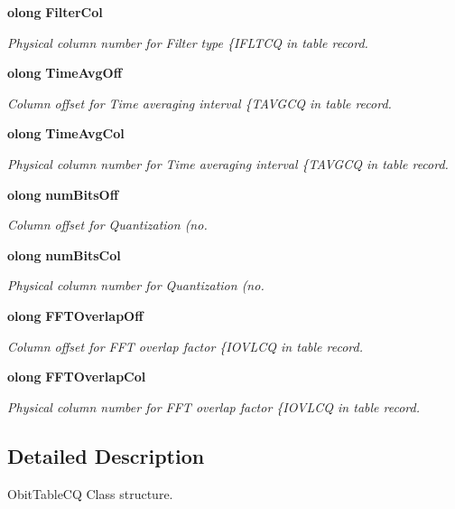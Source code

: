 \begin{CompactItemize}
{\bf olong} {\bf Filter\-Col}
\begin{CompactList}\small\item\em Physical column number for Filter type \{IFLTCQ in table record. \item\end{CompactList}\item 
{\bf olong} {\bf Time\-Avg\-Off}
\begin{CompactList}\small\item\em Column offset for Time averaging interval \{TAVGCQ in table record. \item\end{CompactList}\item 
{\bf olong} {\bf Time\-Avg\-Col}
\begin{CompactList}\small\item\em Physical column number for Time averaging interval \{TAVGCQ in table record. \item\end{CompactList}\item 
{\bf olong} {\bf num\-Bits\-Off}
\begin{CompactList}\small\item\em Column offset for Quantization (no. \item\end{CompactList}\item 
{\bf olong} {\bf num\-Bits\-Col}
\begin{CompactList}\small\item\em Physical column number for Quantization (no. \item\end{CompactList}\item 
{\bf olong} {\bf FFTOverlap\-Off}
\begin{CompactList}\small\item\em Column offset for FFT overlap factor \{IOVLCQ in table record. \item\end{CompactList}\item 
{\bf olong} {\bf FFTOverlap\-Col}
\begin{CompactList}\small\item\em Physical column number for FFT overlap factor \{IOVLCQ in table record. \item\end{CompactList}\end{CompactItemize}


\subsection{Detailed Description}
Obit\-Table\-CQ Class structure. 



